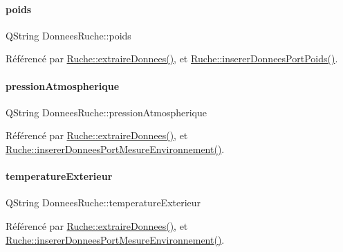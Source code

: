 \mbox{\label{struct_donnees_ruche_af825ee2a3638e519d531c62311592d20}} 
\paragraph{\texorpdfstring{poids}{poids}}
{\footnotesize\ttfamily Q\+String Donnees\+Ruche\+::poids}



Référencé par \hyperlink{class_ruche_a21c0dafeaec03d451590037343e6a3ca}{Ruche\+::extraire\+Donnees()}, et \hyperlink{class_ruche_a923f42fc4878a01f6102966a748e8f37}{Ruche\+::inserer\+Donnees\+Port\+Poids()}.

\mbox{\label{struct_donnees_ruche_ad34347d2201eeae5834fd5dc4d0ed512}} 
\paragraph{\texorpdfstring{pression\+Atmospherique}{pressionAtmospherique}}
{\footnotesize\ttfamily Q\+String Donnees\+Ruche\+::pression\+Atmospherique}



Référencé par \hyperlink{class_ruche_a21c0dafeaec03d451590037343e6a3ca}{Ruche\+::extraire\+Donnees()}, et \hyperlink{class_ruche_a46c0f440f40a5125f2d579b481660457}{Ruche\+::inserer\+Donnees\+Port\+Mesure\+Environnement()}.

\mbox{\label{struct_donnees_ruche_aebc52e7707ccf6ae31d2150533cfb0ba}} 
\paragraph{\texorpdfstring{temperature\+Exterieur}{temperatureExterieur}}
{\footnotesize\ttfamily Q\+String Donnees\+Ruche\+::temperature\+Exterieur}



Référencé par \hyperlink{class_ruche_a21c0dafeaec03d451590037343e6a3ca}{Ruche\+::extraire\+Donnees()}, et \hyperlink{class_ruche_a46c0f440f40a5125f2d579b481660457}{Ruche\+::inserer\+Donnees\+Port\+Mesure\+Environnement()}.

